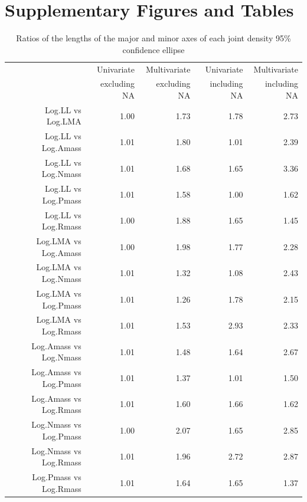 \documentclass[12pt,fleqn]{article}
\newcommand{\beginsupplement}{%
        \setcounter{table}{0}
        \renewcommand{\thetable}{S\arabic{table}}%
        \setcounter{figure}{0}
        \renewcommand{\thefigure}{S\arabic{figure}}%
     }
\begin{document}
\newpage
\newpage 
\section {Supplementary Figures and Tables}
\beginsupplement

\begin{table}[hb]
\centering
\caption{Ratios of the lengths of the major and minor axes of each joint density 95\% confidence ellipse}
\begin{tabular}{rrrrr}
  \hline
   & Univariate & Multivariate & Univariate & Multivariate \\ 
 & excluding NA & excluding NA & including NA & including NA \\ 
  \hline
Log.LL vs Log.LMA & 1.00 & 1.73 & 1.78 & 2.73 \\ 
  Log.LL vs Log.Amass & 1.01 & 1.80 & 1.01 & 2.39 \\ 
  Log.LL vs Log.Nmass & 1.01 & 1.68 & 1.65 & 3.36 \\ 
  Log.LL vs Log.Pmass & 1.01 & 1.58 & 1.00 & 1.62 \\ 
  Log.LL vs Log.Rmass & 1.00 & 1.88 & 1.65 & 1.45 \\ 
  Log.LMA vs Log.Amass & 1.00 & 1.98 & 1.77 & 2.28 \\ 
  Log.LMA vs Log.Nmass & 1.01 & 1.32 & 1.08 & 2.43 \\ 
  Log.LMA vs Log.Pmass & 1.01 & 1.26 & 1.78 & 2.15 \\ 
  Log.LMA vs Log.Rmass & 1.01 & 1.53 & 2.93 & 2.33 \\ 
  Log.Amass vs Log.Nmass & 1.01 & 1.48 & 1.64 & 2.67 \\ 
  Log.Amass vs Log.Pmass & 1.01 & 1.37 & 1.01 & 1.50 \\ 
  Log.Amass vs Log.Rmass & 1.01 & 1.60 & 1.66 & 1.62 \\ 
  Log.Nmass vs Log.Pmass & 1.00 & 2.07 & 1.65 & 2.85 \\ 
  Log.Nmass vs Log.Rmass & 1.01 & 1.96 & 2.72 & 2.87 \\ 
  Log.Pmass vs Log.Rmass & 1.01 & 1.64 & 1.65 & 1.37 \\ 
   \hline
\end{tabular}
\end{table}
\end{document}
